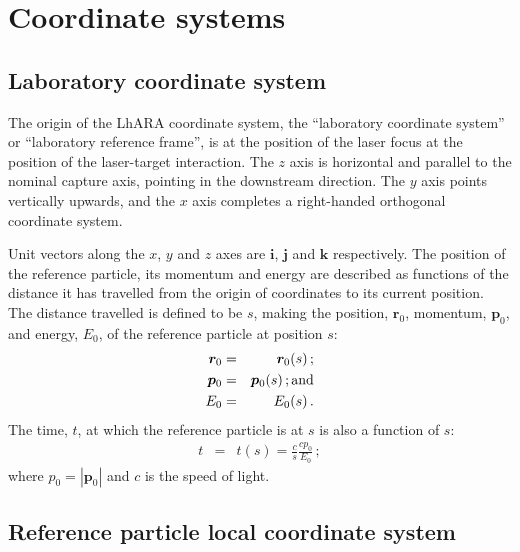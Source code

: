 \graphicspath{ {02-CoordinateSystems/Figures/} }

\section{Coordinate systems}

\subsection{Laboratory coordinate system}

The origin of the LhARA coordinate system, the ``laboratory coordinate
system'' or ``laboratory reference frame'', is at the position of the
laser focus at the position of the laser-target interaction.
The $z$ axis is horizontal and parallel to the nominal capture axis,
pointing in the downstream direction.
The $y$ axis points vertically upwards, and the $x$ axis completes a
right-handed orthogonal coordinate system. 

Unit vectors along the $x$, $y$ and $z$ axes are $\bm{i}$, $\bm{j}$
and $\bm{k}$ respectively.
The position of the reference particle, its momentum and energy are
described as functions of the distance it has travelled from the origin
of coordinates to its current position.
The distance travelled is defined to be $s$, making the position,
$\bm{r}_0$, momentum, $\bm{p}_0$, and energy, $E_0$, of the
reference particle at position $s$:
\begin{eqnarray}
  \bm{r}_0 & = & \bm{r}_0(s)\, ;           \nonumber \\
  \bm{p}_0 & = & \bm{p}_0(s)\, {\rm ; and}           \\
       E_0 & = &      E_0(s)\, .           \nonumber
\end{eqnarray}
The time, $t$, at which the reference particle is at $s$ is also a
function of $s$:
\begin{eqnarray}
        t  & = & t(s) = \frac{c}{s} \frac{c p_0}{E_0}\, ; 
\end{eqnarray}
where $p_0=\left|\bm{p}_0\right|$ and $c$ is the speed of light.

\subsection{Reference particle local coordinate system}

